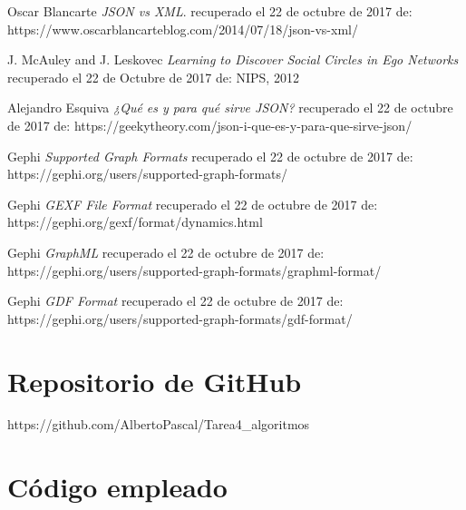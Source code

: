 \documentclass[conference]{IEEEtran}
\begin{document}
\begin{thebibliography}{9}
Oscar Blancarte
\textit{JSON vs XML}.
recuperado el 22 de octubre de 2017 de: https://www.oscarblancarteblog.com/2014/07/18/json-vs-xml/

J. McAuley and J. Leskovec
\textit{Learning to Discover Social Circles in Ego Networks}
recuperado el 22 de Octubre de 2017 de:  NIPS, 2012\

Alejandro Esquiva
\textit{¿Qué es y para qué sirve JSON?}
recuperado el 22 de octubre de 2017 de: https://geekytheory.com/json-i-que-es-y-para-que-sirve-json/

Gephi
\textit{Supported Graph Formats}
recuperado el 22 de octubre de 2017 de: https://gephi.org/users/supported-graph-formats/

Gephi
\textit{GEXF File Format}
recuperado el 22 de octubre de 2017 de: https://gephi.org/gexf/format/dynamics.html

Gephi
\textit{GraphML}
recuperado el 22 de octubre de 2017 de: https://gephi.org/users/supported-graph-formats/graphml-format/

Gephi
\textit{GDF Format}
recuperado el 22 de octubre de 2017 de: https://gephi.org/users/supported-graph-formats/gdf-format/
\end{thebibliography}

\appendix
\section{Repositorio de GitHub}
https://github.com/AlbertoPascal/Tarea4\_algoritmos

\onecolumn
\newpage
\section{Código empleado}



\end{document}
